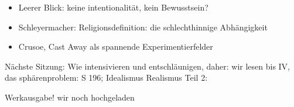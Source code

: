 \documentclass[emulatestandardclasses]{scrartcl}
\begin{document}
\begin{itemize}
  \item Leerer Blick: keine intentionalität, kein Bewusstsein?
  \item Schleyermacher: Religionsdefinition: die schlechthinnige Abhängigkeit 
  \item Crusoe, Cast Away als spannende Experimentierfelder
\end{itemize}

Nächste Sitzung: Wie intensivieren und entschläunigen, daher: wir lesen bis IV, das sphärenproblem: S 196; Idealismus Realismus Teil 2: 

Werkausgabe! wir noch hochgeladen

\newpage
%


\end{document}
